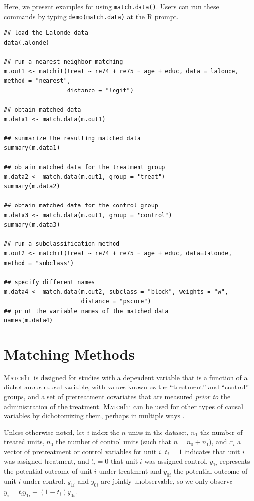 \documentclass[oneside,letterpaper,titlepage]{article}
\newcommand{\MatchIt}{\textsc{MatchIt}}
\begin{document}
Here, we present examples for using {\tt match.data()}. Users can run
these commands by typing {\tt demo(match.data)} at the R prompt.
\begin{verbatim}
## load the Lalonde data
data(lalonde)

## run a nearest neighbor matching
m.out1 <- matchit(treat ~ re74 + re75 + age + educ, data = lalonde, method = "nearest",  
                  distance = "logit")

## obtain matched data 
m.data1 <- match.data(m.out1)

## summarize the resulting matched data
summary(m.data1)

## obtain matched data for the treatment group
m.data2 <- match.data(m.out1, group = "treat")
summary(m.data2)

## obtain matched data for the control group
m.data3 <- match.data(m.out1, group = "control")
summary(m.data3)

## run a subclassification method
m.out2 <- matchit(treat ~ re74 + re75 + age + educ, data=lalonde, method = "subclass")

## specify different names
m.data4 <- match.data(m.out2, subclass = "block", weights = "w",
                      distance = "pscore")
## print the variable names of the matched data
names(m.data4)
\end{verbatim}


\section{Matching Methods}
\label{methods}

\MatchIt\ is designed for studies with a dependent variable that is a
function of a dichotomous causal variable, with values known as
the ``treatment'' and ``control'' groups, and a set of pretreatment
covariates that are measured {\it prior to} the administration of the
treatment.  \MatchIt\ can be used for other types of causal variables
by dichotomizing them, perhaps in multiple ways \citep[see
also][]{ImaDyk04}.

Unless otherwise noted, let $i$ index the $n$ units in the dataset,
$n_1$ the number of treated units, $n_0$ the number of control units
(such that $n=n_0+n_1$), and $x_i$ a vector of pretreatment or control
variables for unit $i$.  $t_i=1$ indicates that unit $i$ was assigned
treatment, and $t_i=0$ that unit $i$ was assigned control.  $y_{1i}$
represents the potential outcome of unit $i$ under treatment and
$y_{0i}$ the potential outcome of unit $i$ under control.  $y_{1i}$
and $y_{0i}$ are jointly unobservable, so we only observe
$y_i=t_iy_{1i}+(1-t_i)y_{0i}$.
\end{document}
